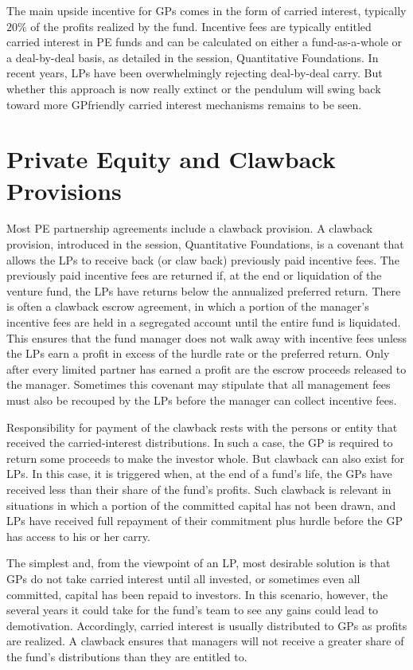 \documentclass[11pt]{article}
\begin{document}
The main upside incentive for GPs comes in the form of carried interest, typically $20 \%$ of the profits realized by the fund. Incentive fees are typically entitled carried interest in PE funds and can be calculated on either a fund-as-a-whole or a deal-by-deal basis, as detailed in the session, Quantitative Foundations. In recent years, LPs have been overwhelmingly rejecting deal-by-deal carry. But whether this approach is now really extinct or the pendulum will swing back toward more GPfriendly carried interest mechanisms remains to be seen.

\section*{Private Equity and Clawback Provisions}
Most PE partnership agreements include a clawback provision. A clawback provision, introduced in the session, Quantitative Foundations, is a covenant that allows the LPs to receive back (or claw back) previously paid incentive fees. The previously paid incentive fees are returned if, at the end or liquidation of the venture fund, the LPs have returns below the annualized preferred return. There is often a clawback escrow agreement, in which a portion of the manager's incentive fees are held in a segregated account until the entire fund is liquidated. This ensures that the fund manager does not walk away with incentive fees unless the LPs earn a profit in excess of the hurdle rate or the preferred return. Only after every limited partner has earned a profit are the escrow proceeds released to the manager. Sometimes this covenant may stipulate that all management fees must also be recouped by the LPs before the manager can collect incentive fees.

Responsibility for payment of the clawback rests with the persons or entity that received the carried-interest distributions. In such a case, the GP is required to return some proceeds to make the investor whole. But clawback can also exist for LPs. In this case, it is triggered when, at the end of a fund's life, the GPs have received less than their share of the fund's profits. Such clawback is relevant in situations in which a portion of the committed capital has not been drawn, and LPs have received full repayment of their commitment plus hurdle before the GP has access to his or her carry.

The simplest and, from the viewpoint of an LP, most desirable solution is that GPs do not take carried interest until all invested, or sometimes even all committed, capital has been repaid to investors. In this scenario, however, the several years it could take for the fund's team to see any gains could lead to demotivation. Accordingly, carried interest is usually distributed to GPs as profits are realized. A clawback ensures that managers will not receive a greater share of the fund's distributions than they are entitled to.
\end{document}
